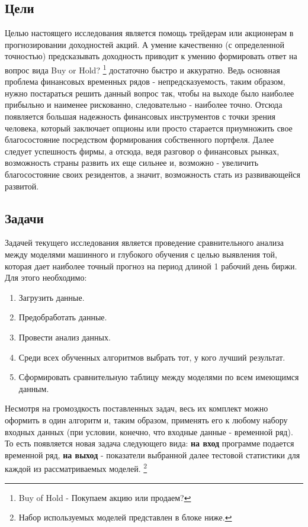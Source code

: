 	\subsection{Цели}
		Целью настоящего исследования является помощь трейдерам или акционерам в прогнозировании доходностей акций. А умение качественно (с определенной точностью) предсказывать доходность приводит к умению формировать ответ на вопрос вида Buy or Hold? \footnote{Buy of Hold - Покупаем акцию или продаем?} достаточно быстро и аккуратно. Ведь основная проблема финансовых временных рядов - непредсказуемость, таким образом, нужно постараться решить данный вопрос так, чтобы на выходе было наиболее прибыльно и наименее рискованно, следовательно - наиболее точно. Отсюда появляется большая надежность финансовых инструментов с точки зрения человека, который заключает опционы или просто старается приумножить свое благосостояние посредством формирования собственного портфеля. Далее следует успешность фирмы, а отсюда, ведя разговор о финансовых рынках, возможность страны развить их еще сильнее и, возможно - увеличить благосостояние своих резидентов, а значит, возможность стать из развивающейся развитой. 
	\subsection{Задачи}
		Задачей текущего исследования является проведение сравнительного анализа между моделями машинного и глубокого обучения с целью выявления той, которая дает наиболее точный прогноз на период длиной 1 рабочий день биржи. Для этого необходимо:
		\begin{enumerate}
			\item Загрузить данные.
			\item Предобработать данные.
			\item Провести анализ данных.
			\item Среди всех обученных алгоритмов выбрать тот, у кого лучший результат.
			\item Сформировать сравнительную таблицу между моделями по всем имеющимся данным.
		\end{enumerate}
		Несмотря на громоздкость поставленных задач, весь их комплект можно оформить в один алгоритм и, таким образом, применять его к любому набору входных данных (при условии, конечно, что входные данные - временной ряд). То есть появляется новая задача следующего вида: \textbf{на вход} программе подается временной ряд, \textbf{на выход} - показатели выбранной далее  тестовой статистики для каждой из рассматриваемых моделей. \footnote{Набор используемых моделей представлен в блоке ниже.}                  
